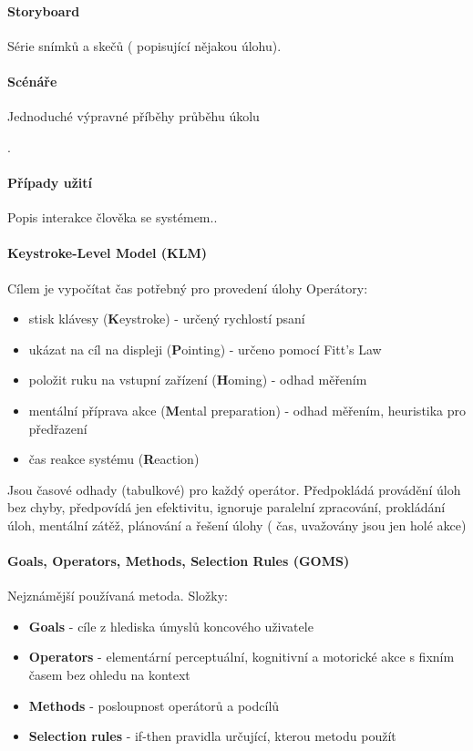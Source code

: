 \paragraph{Storyboard} Série snímků a skečů ( popisující nějakou úlohu).

\paragraph{Scénáře} Jednoduché výpravné příběhy průběhu úkolu

\textit{}.

\paragraph{Případy užití} Popis interakce člověka se systémem..

\paragraph{Keystroke-Level Model (KLM)}
Cílem je vypočítat čas potřebný pro provedení úlohy
Operátory:
\begin{itemize}[itemsep=0px]
\item stisk klávesy (\textbf{K}eystroke) - určený rychlostí psaní
\item ukázat na cíl na displeji (\textbf{P}ointing) - určeno pomocí Fitt's Law
\item položit ruku na vstupní zařízení (\textbf{H}oming) - odhad měřením
\item mentální příprava akce (\textbf{M}ental preparation) - odhad měřením, heuristika pro předřazení
\item čas reakce systému (\textbf{R}eaction)
\end{itemize}
Jsou časové odhady (tabulkové) pro každý operátor. Předpokládá provádění úloh bez chyby, předpovídá jen efektivitu, ignoruje paralelní zpracování, prokládání úloh, mentální zátěž, plánování a řešení úlohy ( čas, uvažovány jsou jen holé akce)


\paragraph{Goals, Operators, Methods, Selection Rules (GOMS)}
Nejznámější používaná metoda. Složky:
\begin{itemize}[itemsep=0px]
\item \textbf{Goals} - cíle z hlediska úmyslů koncového uživatele
\item  \textbf{Operators} - elementární perceptuální, kognitivní a motorické akce s fixním časem
bez ohledu na kontext
\item \textbf{Methods} - posloupnost operátorů a podcílů
\item \textbf{Selection rules} - if-then pravidla určující, kterou metodu použít
\end{itemize}

